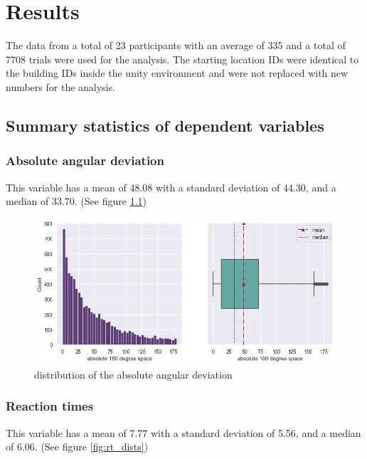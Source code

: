 \chapter{Results}

The data from a total of 23 participants with an average of 335 and a total of 7708 trials were used for the analysis. The starting location IDs were identical to the building IDs inside the unity environment and were not replaced with new numbers for the analysis.

\section{Summary statistics of dependent variables}

\subsection{Absolute angular deviation}

This variable has a mean of 48.08 with a standard deviation of 44.30, and a median of 33.70. (See figure \ref{fig:angular_dev_dists})

\begin{figure}[!htb]
	\centering
	\includegraphics[width=150mm]{figures/angular_deviation_hist_box_23.png}
	\caption[Distribution of the absolute angular deviation]{distribution of the absolute angular deviation}
	\label{fig:angular_dev_dists}
\end{figure}

\subsection{Reaction times}

This variable has a mean of 7.77 with a standard deviation of 5.56, and a median of 6.06. (See figure \ref{fig:rt_dists})


